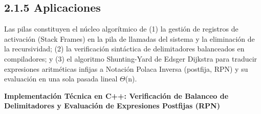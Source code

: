 \documentclass[11pt,letterpaper]{article}
\begin{document}
\subsection*{2.1.5 Aplicaciones}
Las pilas constituyen el núcleo algorítmico de (1) la gestión de registros de activación (Stack Frames) en la pila de llamadas del sistema y la eliminación de la recursividad; (2) la verificación sintáctica de delimitadores balanceados en compiladores; y (3) el algoritmo Shunting-Yard de Edsger Dijkstra para traducir expresiones aritméticas infijas a Notación Polaca Inversa (postfija, RPN) y su evaluación en una sola pasada lineal $\Theta$(n).\par
\vspace{4pt}\noindent\textbf{\color{ipnblue}Implementación Técnica en C++: Verificación de Balanceo de Delimitadores y Evaluación de Expresiones Postfijas (RPN)}\par\vspace{-2pt}
\end{document}

